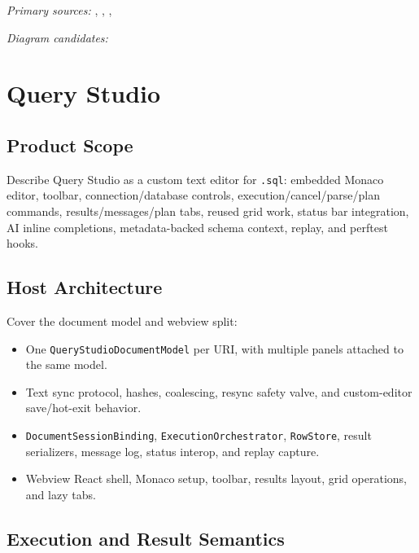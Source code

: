 \documentclass[11pt]{article}
\newcommand{\code}[1]{\texttt{#1}}
\begin{document}
\noindent\textit{Primary sources:} , , , 

\noindent\textit{Diagram candidates:} 

\section{Query Studio}

\subsection{Product Scope}

Describe Query Studio as a custom text editor for \code{.sql}: embedded Monaco editor, toolbar, connection/database controls, execution/cancel/parse/plan commands, results/messages/plan tabs, reused grid work, status bar integration, AI inline completions, metadata-backed schema context, replay, and perftest hooks.

\subsection{Host Architecture}

Cover the document model and webview split:

\begin{itemize}
	\item One \code{QueryStudioDocumentModel} per URI, with multiple panels attached to the same model.
	\item Text sync protocol, hashes, coalescing, resync safety valve, and custom-editor save/hot-exit behavior.
	\item \code{DocumentSessionBinding}, \code{ExecutionOrchestrator}, \code{RowStore}, result serializers, message log, status interop, and replay capture.
	\item Webview React shell, Monaco setup, toolbar, results layout, grid operations, and lazy tabs.
\end{itemize}

\subsection{Execution and Result Semantics}
\end{document}
